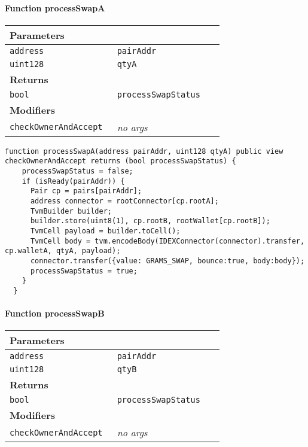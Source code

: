 \paragraph{Function processSwapA}


\ifsoltables
\noindent\begin{tabular}{|l|l|p{5cm}|}\hline
\multicolumn{3}{|l|}{\bf Parameters}\\\hline
\tt address & \tt pairAddr &\\\hline
\tt uint128 & \tt qtyA &\\\hline
\multicolumn{3}{|l|}{\bf Returns}\\\hline
\tt bool & \tt processSwapStatus &\\\hline
\multicolumn{3}{|l|}{\bf Modifiers}\\\hline
\tt checkOwnerAndAccept & {\em no args} &\\\hline
\end{tabular}
\fi

\vspace{2cm}

\begin{lstlisting}[firstnumber=221]
  function processSwapA(address pairAddr, uint128 qtyA) public view checkOwnerAndAccept returns (bool processSwapStatus) {
    processSwapStatus = false;
    if (isReady(pairAddr)) {
      Pair cp = pairs[pairAddr];
      address connector = rootConnector[cp.rootA];
      TvmBuilder builder;
      builder.store(uint8(1), cp.rootB, rootWallet[cp.rootB]);
      TvmCell payload = builder.toCell();
      TvmCell body = tvm.encodeBody(IDEXConnector(connector).transfer, cp.walletA, qtyA, payload);
      connector.transfer({value: GRAMS_SWAP, bounce:true, body:body});
      processSwapStatus = true;
    }
  }
\end{lstlisting}

\paragraph{Function processSwapB}


\ifsoltables
\noindent\begin{tabular}{|l|l|p{5cm}|}\hline
\multicolumn{3}{|l|}{\bf Parameters}\\\hline
\tt address & \tt pairAddr &\\\hline
\tt uint128 & \tt qtyB &\\\hline
\multicolumn{3}{|l|}{\bf Returns}\\\hline
\tt bool & \tt processSwapStatus &\\\hline
\multicolumn{3}{|l|}{\bf Modifiers}\\\hline
\tt checkOwnerAndAccept & {\em no args} &\\\hline
\end{tabular}
\fi

